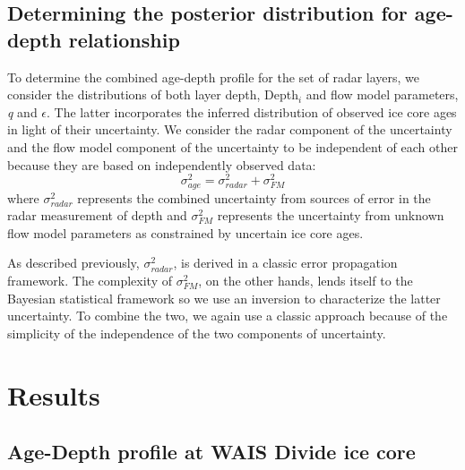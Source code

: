 \documentclass[12pt]{article}
\begin{document}

\subsection{Determining the posterior distribution for age-depth relationship}
To determine the combined age-depth profile for the set of radar layers, we consider the distributions of both layer depth, Depth$_i$ and flow model parameters, \textit{q} and $\epsilon$. The latter incorporates the inferred distribution of observed ice core ages in light of their uncertainty. We consider the radar component of the uncertainty and the flow model component of the uncertainty to be independent of each other because they are based on independently observed data:
\begin{equation}
\sigma^2_{age} = \sigma^2_{radar} + \sigma^2_{FM}
\end{equation}
where $\sigma^2_{radar}$ represents the combined uncertainty from sources of error in the radar measurement of depth and $ \sigma^2_{FM}$ represents the uncertainty from unknown flow model parameters as constrained by uncertain ice core ages. 

As described previously, $\sigma^2_{radar}$, is derived in a classic error propagation framework. The complexity of $ \sigma^2_{FM}$, on the other hands, lends itself to the Bayesian statistical framework so we use an inversion to characterize the latter uncertainty. To combine the two, we again use a classic approach because of the simplicity of the independence of the two components of uncertainty.

\section{Results}

\subsection{Age-Depth profile at WAIS Divide ice core}
\end{document}

